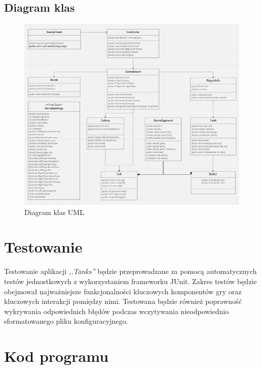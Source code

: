 \documentclass[11pt,a4paper]{report}
\begin{document}
\subsection{Diagram klas}
 \begin{figure}[!ht]
\centerline{\includegraphics{img/classDiagram.png}}
\caption{Diagram klas UML}
\end{figure}
\newpage
\section{Testowanie}
Testowanie aplikacji \textsl{,,Tanks''} będzie przeprowadzane za pomocą automatycznych testów jednostkowych z wykorzystaniem frameworku JUnit.
Zakres testów będzie obejmował najważniejsze funkcjonalności kluczowych komponentów gry oraz kluczowych interakcji pomiędzy nimi. Testowana będzie również poprawność wykrywania odpowiednich błędów podczas wczytywania nieodpowiednio sformatowanego pliku konfiguracyjnego.

\section{Kod programu}
\end{document}
